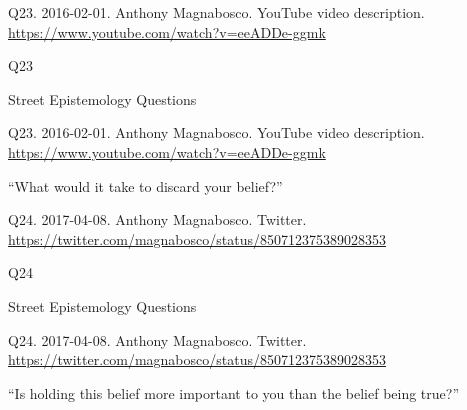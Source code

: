 \documentclass[
    src/templates/5x2-on-a4paper,
    frame
]{flashcards}
\newcommand{\myheader}{}
\newcommand{\myfooter}{
    \begin{flushright}
        \small\sc
        Street Epistemology Questions \par
    \end{flushright}
}
\begin{document}
        \renewcommand{\myheader}{
            \normalfont %
            \begin{tiny}
                Q23.
                2016-02-01.
                Anthony Magnabosco.
                    YouTube video description.
                    \\
                    \url{ https://www.youtube.com/watch?v=eeADDe-ggmk }
                \par
            \end{tiny}
        }
        \begin{flashcard}{
            \myheader
            \vspace{\fill}
            \begin{center}
                \large
                    Q23
            \end{center}
            \vspace{\fill}
            \myfooter
            \vspace{-1.4ex}
        }
            \myheader
            \vspace{\fill}
            \begin{center}
                \large
\enquote{What would it take to discard your belief?}            \end{center}
            \vspace{\fill}
        \end{flashcard}
        \renewcommand{\myheader}{
            \normalfont %
            \begin{tiny}
                Q24.
                2017-04-08.
                Anthony Magnabosco.
                    Twitter.
                    \\
                    \url{ https://twitter.com/magnabosco/status/850712375389028353 }
                \par
            \end{tiny}
        }
        \begin{flashcard}{
            \myheader
            \vspace{\fill}
            \begin{center}
                \large
                    Q24
            \end{center}
            \vspace{\fill}
            \myfooter
            \vspace{-1.4ex}
        }
            \myheader
            \vspace{\fill}
            \begin{center}
                \large
\enquote{Is holding this belief more important to you than the belief being true?}            \end{center}
            \vspace{\fill}
        \end{flashcard}
\end{document}
